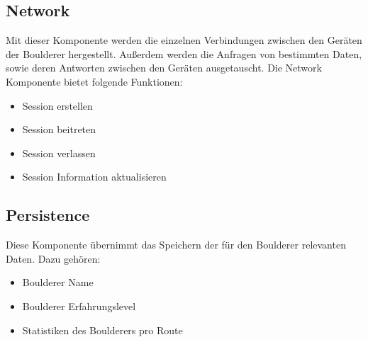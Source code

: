 \documentclass[11pt,a4paper,headsepline,footsepline,bibliography=totocnumbered]{article}
\begin{document}
  \subsection{Network}
    \par
      Mit dieser Komponente werden die einzelnen Verbindungen zwischen den Geräten der Boulderer hergestellt. Außerdem werden die Anfragen von bestimmten Daten, sowie deren Antworten zwischen den Geräten ausgetauscht.
      Die Network Komponente bietet folgende Funktionen:
      \begin{itemize}
        \item Session erstellen
        \item Session beitreten
        \item Session verlassen
        \item Session Information aktualisieren
      \end{itemize}

  \subsection{Persistence}
    \par
      Diese Komponente übernimmt das Speichern der für den Boulderer relevanten Daten.
      Dazu gehören:
      \begin{itemize}
        \item Boulderer Name
        \item Boulderer Erfahrungslevel
        \item Statistiken des Boulderers pro Route
      \end{itemize}
\end{document}
